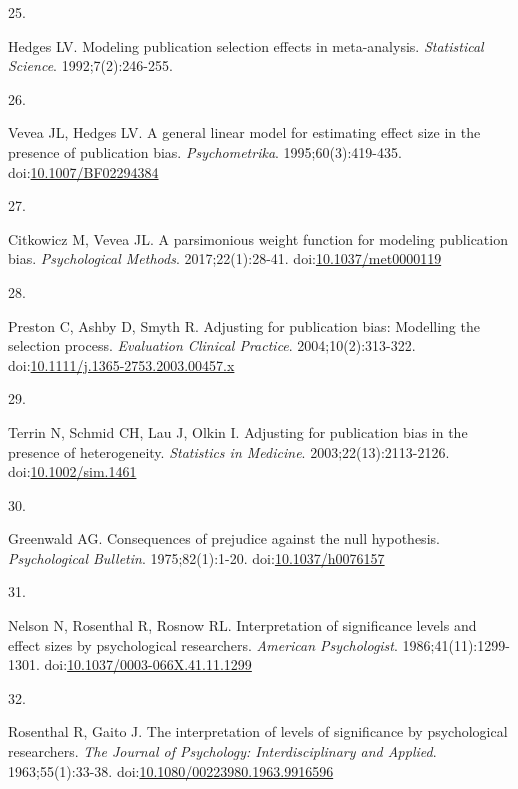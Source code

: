 \documentclass[
  american,
  man, donotrepeattitle,floatsintext]{apa7}
\newlength{\cslhangindent}
\newlength{\csllabelwidth}
\newenvironment{CSLReferences}[2] %
 {\begin{list}{}{%
  \setlength{\itemindent}{0pt}
  \setlength{\leftmargin}{0pt}
  \setlength{\parsep}{0pt}
  \ifodd #1
   \setlength{\leftmargin}{\cslhangindent}
   \setlength{\itemindent}{-1\cslhangindent}
  \fi
  \setlength{\itemsep}{#2\baselineskip}}}
 {\end{list}}
\newcommand{\CSLLeftMargin}[1]{\parbox[t]{\csllabelwidth}{\strut#1\strut}}
\newcommand{\CSLRightInline}[1]{\parbox[t]{\linewidth - \csllabelwidth}{\strut#1\strut}}
\begin{document}
\begin{CSLReferences}{0}{1}
\CSLLeftMargin{25. }%
\CSLRightInline{Hedges LV. Modeling publication selection effects in meta-analysis. \emph{Statistical Science}. 1992;7(2):246-255.}

\CSLLeftMargin{26. }%
\CSLRightInline{Vevea JL, Hedges LV. A general linear model for estimating effect size in the presence of publication bias. \emph{Psychometrika}. 1995;60(3):419-435. doi:\href{https://doi.org/10.1007/BF02294384}{10.1007/BF02294384}}

\CSLLeftMargin{27. }%
\CSLRightInline{Citkowicz M, Vevea JL. {A parsimonious weight function for modeling publication bias}. \emph{Psychological Methods}. 2017;22(1):28-41. doi:\href{https://doi.org/10.1037/met0000119}{10.1037/met0000119}}

\CSLLeftMargin{28. }%
\CSLRightInline{Preston C, Ashby D, Smyth R. Adjusting for publication bias: Modelling the selection process. \emph{Evaluation Clinical Practice}. 2004;10(2):313-322. doi:\href{https://doi.org/10.1111/j.1365-2753.2003.00457.x}{10.1111/j.1365-2753.2003.00457.x}}

\CSLLeftMargin{29. }%
\CSLRightInline{Terrin N, Schmid CH, Lau J, Olkin I. Adjusting for publication bias in the presence of heterogeneity. \emph{Statistics in Medicine}. 2003;22(13):2113-2126. doi:\href{https://doi.org/10.1002/sim.1461}{10.1002/sim.1461}}

\CSLLeftMargin{30. }%
\CSLRightInline{Greenwald AG. Consequences of prejudice against the null hypothesis. \emph{Psychological Bulletin}. 1975;82(1):1-20. doi:\href{https://doi.org/10.1037/h0076157}{10.1037/h0076157}}

\CSLLeftMargin{31. }%
\CSLRightInline{Nelson N, Rosenthal R, Rosnow RL. Interpretation of significance levels and effect sizes by psychological researchers. \emph{American Psychologist}. 1986;41(11):1299-1301. doi:\href{https://doi.org/10.1037/0003-066X.41.11.1299}{10.1037/0003-066X.41.11.1299}}

\CSLLeftMargin{32. }%
\CSLRightInline{Rosenthal R, Gaito J. The interpretation of levels of significance by psychological researchers. \emph{The Journal of Psychology: Interdisciplinary and Applied}. 1963;55(1):33-38. doi:\href{https://doi.org/10.1080/00223980.1963.9916596}{10.1080/00223980.1963.9916596}}


\end{CSLReferences}
\end{document}

